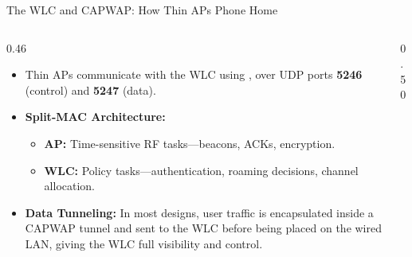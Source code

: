 \documentclass[aspectratio=169]{beamer}
\begin{document}
\begin{frame}{The WLC and CAPWAP: How Thin APs Phone Home}
    \begin{columns}[T]
        \begin{column}{0.46\textwidth}
            \footnotesize
            \begin{itemize}
                \item Thin APs communicate with the WLC using , over UDP ports \textbf{5246} (control) and \textbf{5247} (data).
                \item \textbf{Split-MAC Architecture:}
                    \begin{itemize}
                        \item \textbf{AP:} Time-sensitive RF tasks---beacons, ACKs, encryption.
                        \item \textbf{WLC:} Policy tasks---authentication, roaming decisions, channel allocation.
                    \end{itemize}
                \item \textbf{Data Tunneling:} In most designs, user traffic is encapsulated inside a CAPWAP tunnel and sent to the WLC before being placed on the wired LAN, giving the WLC full visibility and control.
            \end{itemize}
        \end{column}
        \begin{column}{0.50\textwidth}
            \begin{center}
\end{center}
\end{column}
\end{columns}
\end{frame}
\end{document}
